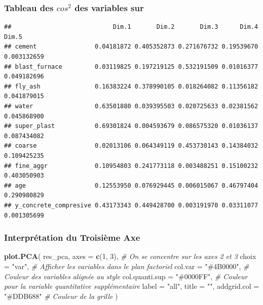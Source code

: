 \documentclass[
  12pt,
]{article}
\newenvironment{Shaded}{\begin{snugshade}}{\end{snugshade}}
\newcommand{\AttributeTok}[1]{\textcolor[rgb]{0.13,0.29,0.53}{#1}}
\newcommand{\CommentTok}[1]{\textcolor[rgb]{0.56,0.35,0.01}{\textit{#1}}}
\newcommand{\DecValTok}[1]{\textcolor[rgb]{0.00,0.00,0.81}{#1}}
\newcommand{\FloatTok}[1]{\textcolor[rgb]{0.00,0.00,0.81}{#1}}
\newcommand{\FunctionTok}[1]{\textcolor[rgb]{0.13,0.29,0.53}{\textbf{#1}}}
\newcommand{\NormalTok}[1]{#1}
\newcommand{\OtherTok}[1]{\textcolor[rgb]{0.56,0.35,0.01}{#1}}
\newcommand{\SpecialCharTok}[1]{\textcolor[rgb]{0.81,0.36,0.00}{\textbf{#1}}}
\newcommand{\StringTok}[1]{\textcolor[rgb]{0.31,0.60,0.02}{#1}}
\begin{document}
\subsubsection{\texorpdfstring{Tableau des \(cos^2\) des variables
sur}{Tableau des cos\^{}2 des variables sur}}\label{tableau-des-cos2-des-variables-sur}

\begin{Shaded}
\end{Shaded}

\begin{verbatim}
##                            Dim.1       Dim.2       Dim.3      Dim.4       Dim.5
## cement                0.04181872 0.405352873 0.271676732 0.19539670 0.003132659
## blast_furnace         0.03119825 0.197219125 0.532191509 0.01016377 0.049182696
## fly_ash               0.16383224 0.378990105 0.018264082 0.11356182 0.041879015
## water                 0.63501880 0.039395503 0.020725633 0.02381562 0.045868900
## super_plast           0.69301824 0.004593679 0.086575320 0.01036137 0.087434082
## coarse                0.02013106 0.064349119 0.453730143 0.14384032 0.109425235
## fine_aggr             0.10954803 0.241773118 0.003488251 0.15100232 0.403050903
## age                   0.12553950 0.076929445 0.006015067 0.46797404 0.290980829
## y_concrete_compresive 0.43173343 0.449428700 0.003191970 0.03311077 0.001305699
\end{verbatim}

\subsubsection{Interprétation du Troisième
Axe}\label{interpruxe9tation-du-troisiuxe8me-axe}

\begin{Shaded}
\begin{Highlighting}[]
\FunctionTok{plot.PCA}\NormalTok{(}
\NormalTok{    res\_pca,}
    \AttributeTok{axes =} \FunctionTok{c}\NormalTok{(}\DecValTok{1}\NormalTok{, }\DecValTok{3}\NormalTok{),             }\CommentTok{\# On se concentre sur les axes 2 et 3}
    \AttributeTok{choix =} \StringTok{"var"}\NormalTok{,              }\CommentTok{\# Afficher les variables dans le plan factoriel}
    \AttributeTok{col.var =} \StringTok{"\#4B0000"}\NormalTok{,        }\CommentTok{\# Couleur des variables alignée au style}
    \AttributeTok{col.quanti.sup =} \StringTok{"\#0000FF"}\NormalTok{, }\CommentTok{\# Couleur pour la variable quantitative supplémentaire}
    \AttributeTok{label =} \StringTok{"all"}\NormalTok{,}
    \AttributeTok{title =} \StringTok{""}\NormalTok{,}
    \AttributeTok{addgrid.col =} \StringTok{"\#DDB688"}     \CommentTok{\# Couleur de la grille}
\NormalTok{  )}
\end{Highlighting}
\end{Shaded}
\end{document}
